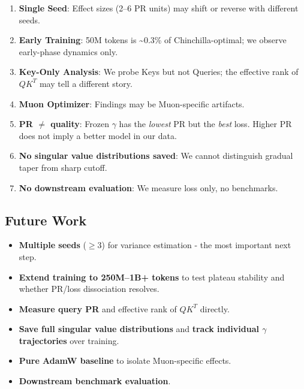 \documentclass[11pt]{article}
\begin{document}
\begin{enumerate}
\item \textbf{Single Seed}: Effect sizes (2--6 PR units) may shift or reverse with different seeds.
\item \textbf{Early Training}: 50M tokens is \textasciitilde0.3\% of Chinchilla-optimal; we observe early-phase dynamics only.
\item \textbf{Key-Only Analysis}: We probe Keys but not Queries; the effective rank of $QK^T$ may tell a different story.
\item \textbf{Muon Optimizer}: Findings may be Muon-specific artifacts.
\item \textbf{PR $\neq$ quality}: Frozen $\gamma$ has the \textit{lowest} PR but the \textit{best} loss. Higher PR does not imply a better model in our data.
\item \textbf{No singular value distributions saved}: We cannot distinguish gradual taper from sharp cutoff.
\item \textbf{No downstream evaluation}: We measure loss only, no benchmarks.
\end{enumerate}

\subsection{Future Work}

\begin{itemize}
\item \textbf{Multiple seeds} ($\geq$3) for variance estimation - the most important next step.
\item \textbf{Extend training to 250M--1B+ tokens} to test plateau stability and whether PR/loss dissociation resolves.
\item \textbf{Measure query PR} and effective rank of $QK^T$ directly.
\item \textbf{Save full singular value distributions} and \textbf{track individual $\gamma$ trajectories} over training.
\item \textbf{Pure AdamW baseline} to isolate Muon-specific effects.
\item \textbf{Downstream benchmark evaluation}.
\end{itemize}
\end{document}
